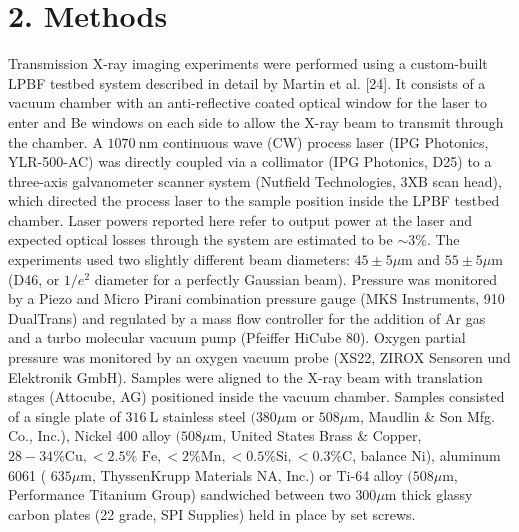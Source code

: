 \documentclass[10pt]{article}
\begin{document}
\section*{2. Methods}
Transmission X-ray imaging experiments were performed using a custom-built LPBF testbed system described in detail by Martin et al. [24]. It consists of a vacuum chamber with an anti-reflective coated optical window for the laser to enter and Be windows on each side to allow the X-ray beam to transmit through the chamber. A $1070 \mathrm{~nm}$ continuous wave (CW) process laser (IPG Photonics, YLR-500-AC) was directly coupled via a collimator (IPG Photonics, D25) to a three-axis galvanometer scanner system (Nutfield Technologies, 3XB scan head), which directed the process laser to the sample position inside the LPBF testbed chamber. Laser powers reported here refer to output power at the laser and expected optical losses through the system are estimated to be $\sim 3 \%$. The experiments used two slightly different beam diameters: $45 \pm 5 \mu \mathrm{m}$ and $55 \pm 5 \mu \mathrm{m}$ (D46, or $1 / e^{2}$ diameter for a perfectly Gaussian beam). Pressure was monitored by a Piezo and Micro Pirani combination pressure gauge (MKS Instruments, 910 DualTrans) and regulated by a mass flow controller for the addition of Ar gas and a turbo molecular vacuum pump (Pfeiffer HiCube 80). Oxygen partial pressure was monitored by an oxygen vacuum probe (XS22, ZIROX Sensoren und Elektronik GmbH). Samples were aligned to the X-ray beam with translation stages (Attocube, AG) positioned inside the vacuum chamber. Samples consisted of a single plate of $316 \mathrm{~L}$ stainless steel $(380 \mu \mathrm{m}$ or $508 \mu \mathrm{m}$, Maudlin \& Son Mfg. Co., Inc.), Nickel 400 alloy $(508 \mu \mathrm{m}$, United States Brass \& Copper, $28-34 \% \mathrm{Cu},<2.5 \%$ $\mathrm{Fe},<2 \% \mathrm{Mn},<0.5 \% \mathrm{Si},<0.3 \% \mathrm{C}$, balance Ni), aluminum 6061 ( $635 \mu \mathrm{m}$, ThyssenKrupp Materials NA, Inc.) or Ti-64 alloy $(508 \mu \mathrm{m}$, Performance Titanium Group) sandwiched between two $300 \mu \mathrm{m}$ thick glassy carbon plates (22 grade, SPI Supplies) held in place by set screws.\\
\end{document}
